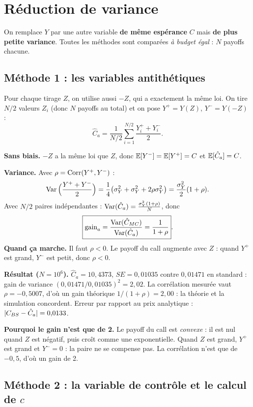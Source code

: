 \section{Réduction de variance}\label{sec:rv}

On remplace $Y$ par une autre variable \textbf{de même espérance} $C$ mais \textbf{de plus petite variance}. Toutes les méthodes sont comparées \emph{à budget égal} : $N$ payoffs chacune.

\subsection{Méthode 1 : les variables antithétiques}

Pour chaque tirage $Z$, on utilise aussi $-Z$, qui a exactement la même loi. On tire $N/2$ valeurs $Z_i$ (donc $N$ payoffs au total) et on pose $Y^+ = Y(Z)$, $Y^- = Y(-Z)$ :
\[
\hat C_{a} = \frac{1}{N/2}\sum_{i=1}^{N/2}\frac{Y^+_i+Y^-_i}{2}.
\]

\begin{demo}
\textbf{Sans biais.} $-Z$ a la même loi que $Z$, donc $\mathbb{E}[Y^-] = \mathbb{E}[Y^+] = C$ et $\mathbb{E}[\hat C_a] = C$.

\textbf{Variance.} Avec $\rho = \operatorname{Corr}(Y^+,Y^-)$ :
\[
\operatorname{Var}\Big(\frac{Y^++Y^-}{2}\Big) = \frac14\big(\sigma_Y^2+\sigma_Y^2+2\rho\sigma_Y^2\big) = \frac{\sigma_Y^2}{2}(1+\rho).
\]
Avec $N/2$ paires indépendantes : $\operatorname{Var}(\hat C_a) = \frac{\sigma_Y^2(1+\rho)}{N}$, donc
\[
\boxed{\text{gain}_{a} = \frac{\operatorname{Var}(\hat C_{MC})}{\operatorname{Var}(\hat C_a)} = \frac{1}{1+\rho}}.
\]
\textbf{Quand ça marche.} Il faut $\rho<0$. Le payoff du call augmente avec $Z$ : quand $Y^+$ est grand, $Y^-$ est petit, donc $\rho<0$.
\end{demo}

\textbf{Résultat ($N = 10^6$).} $\hat C_a = 10{,}4373$, $SE = 0{,}01035$ contre $0{,}01471$ en standard : gain de variance $(0{,}01471/0{,}01035)^2 = 2{,}02$. La corrélation mesurée vaut $\rho = -0{,}5007$, d'où un gain théorique $1/(1+\rho) = 2{,}00$ : la théorie et la simulation concordent. Erreur par rapport au prix analytique : $|C_{BS} - \hat C_a| = 0{,}0133$.

\textbf{Pourquoi le gain n'est que de 2.} Le payoff du call est \emph{convexe} : il est nul quand $Z$ est négatif, puis croît comme une exponentielle. Quand $Z$ est grand, $Y^+$ est grand et $Y^- = 0$ : la paire ne se compense pas. La corrélation n'est que de $-0{,}5$, d'où un gain de 2.

\subsection{Méthode 2 : la variable de contrôle et le calcul de $c$}

